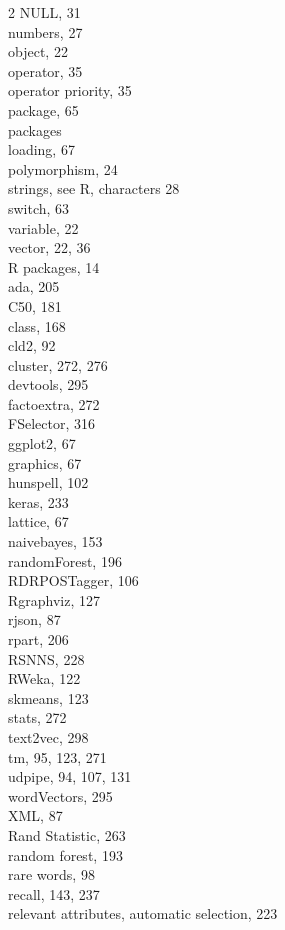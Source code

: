 \documentclass[11pt,openany,executivepaper]{book}
\begin{document}
\begin{multicols}{2}
NULL, 31\\
numbers, 27\\
object, 22\\
operator, 35\\
operator priority, 35\\
package, 65\\
packages\\
loading, 67\\
polymorphism, 24\\
strings, see R, characters 28\\
switch, 63\\
variable, 22\\
vector, 22, 36\\
R packages, 14\\
ada, 205\\
C50, 181\\
class, 168\\
cld2, 92\\
cluster, 272, 276\\
devtools, 295\\
factoextra, 272\\
FSelector, 316\\
ggplot2, 67\\
graphics, 67\\
hunspell, 102\\
keras, 233\\
lattice, 67\\
naivebayes, 153\\
randomForest, 196\\
RDRPOSTagger, 106\\
Rgraphviz, 127\\
rjson, 87\\
rpart, 206\\
RSNNS, 228\\
RWeka, 122\\
skmeans, 123\\
stats, 272\\
text2vec, 298\\
tm, 95, 123, 271\\
udpipe, 94, 107, 131\\
wordVectors, 295\\
XML, 87\\
Rand Statistic, 263\\
random forest, 193\\
rare words, 98\\
recall, 143, 237\\
relevant attributes, automatic selection, 223\\

\end{multicols}
\end{document}
